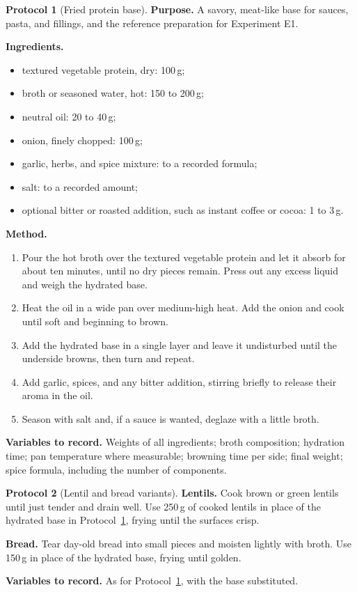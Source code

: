 \documentclass[11pt,openany]{book}
\theoremstyle{definition}
\newtheorem{protocol}{Protocol}[chapter]
\begin{document}
\begin{protocol}[Fried protein base]\label{prot:tvp}
\textbf{Purpose.} A savory, meat-like base for sauces, pasta, and fillings, and the reference preparation for Experiment E1.

\textbf{Ingredients.}
\begin{itemize}
\item textured vegetable protein, dry: 100\,g;
\item broth or seasoned water, hot: 150 to 200\,g;
\item neutral oil: 20 to 40\,g;
\item onion, finely chopped: 100\,g;
\item garlic, herbs, and spice mixture: to a recorded formula;
\item salt: to a recorded amount;
\item optional bitter or roasted addition, such as instant coffee or cocoa: 1 to 3\,g.
\end{itemize}

\textbf{Method.}
\begin{enumerate}
\item Pour the hot broth over the textured vegetable protein and let it absorb for about ten minutes, until no dry pieces remain. Press out any excess liquid and weigh the hydrated base.
\item Heat the oil in a wide pan over medium-high heat. Add the onion and cook until soft and beginning to brown.
\item Add the hydrated base in a single layer and leave it undisturbed until the underside browns, then turn and repeat.
\item Add garlic, spices, and any bitter addition, stirring briefly to release their aroma in the oil.
\item Season with salt and, if a sauce is wanted, deglaze with a little broth.
\end{enumerate}

\textbf{Variables to record.} Weights of all ingredients; broth composition; hydration time; pan temperature where measurable; browning time per side; final weight; spice formula, including the number of components.
\end{protocol}

\begin{protocol}[Lentil and bread variants]\label{prot:variants}
\textbf{Lentils.} Cook brown or green lentils until just tender and drain well. Use 250\,g of cooked lentils in place of the hydrated base in Protocol~\ref{prot:tvp}, frying until the surfaces crisp.

\textbf{Bread.} Tear day-old bread into small pieces and moisten lightly with broth. Use 150\,g in place of the hydrated base, frying until golden.

\textbf{Variables to record.} As for Protocol~\ref{prot:tvp}, with the base substituted.
\end{protocol}
\end{document}
